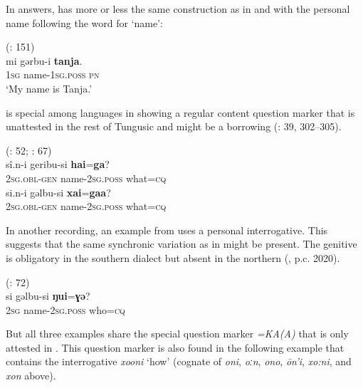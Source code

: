 \documentclass[output=paper,colorlinks,citecolor=brown]{langscibook}
\begin{document}
In answers,  has more or less the same construction as in  and  with the personal name following the word for ‘name’:

\ea
    \label{example4.101}
     (\citealt{KoYurn2011}: 151)\\
    \gll mi		gərbu-i			\textbf{tanja}.\\
    1\textsc{sg}		name-1\textsc{sg.poss}		\textsc{pn}\\
    \glt ‘My name is Tanja.’
    \z

 is special among  languages in showing a regular content question marker that is unattested in the rest of Tungusic and might be a  borrowing (\citealt{Hölzl2018a}: 39, 302–305).

\ea
    \label{example4.102}
     (\citealt{Nakanome1928}: 52; \citealt{Ikegami1997}: 67)\\
    \ea
    \gll sî.n-i			geribu-si		\textbf{hai}=\textbf{ga}?\\
    2\textsc{sg.obl-gen}	name-2\textsc{sg.poss}	what=\textsc{cq}\\

    \ex
    \gll si.n-i			gəlbu-si			\textbf{xai}=\textbf{gaa}?\\
    2\textsc{sg.obl-gen}	name-2\textsc{sg.poss}	what=\textsc{cq}\\
    \z
\z

In another recording, an example from  uses a personal interrogative. This suggests that the same synchronic variation as in  might be present. The genitive is obligatory in the southern dialect but absent in the northern (, p.c. 2020).

\ea
    \label{example4.103}
     (\citealt{Ozolniya2001}: 72)\\
    \gll si		gəlbu-si			\textbf{ŋui}=\textbf{ɣə}?\\
    2\textsc{sg}		name-2\textsc{sg.poss}		who=\textsc{cq}\\
\z

But all three examples share the special question marker \textit{=KA(A)} that is only attested in . This question marker is also found in the following example that contains the interrogative \textit{xooni} ‘how’ (cognate of  \textit{oni},  \textit{oːn},  \textit{ono},  \textit{ōn’i},  \textit{xo:ni}, and  \textit{xon} above).
\end{document}
